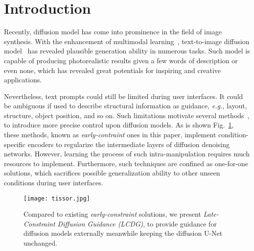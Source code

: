 \documentclass{article}
\begin{document}
\section{Introduction}







Recently, diffusion model has come into prominence in the field of image synthesis. With the enhancement of multimodal learning~\cite{radford2021learning, cherti2022reproducible, raffel2020exploring}, text-to-image diffusion model~\cite{rombach2022high, huang2023composer, saharia2022photorealistic, nichol2021glide, gu2022vector, avrahami2022blended, kim2022diffusionclip, brooks2022instructpix2pix, gafni2022make, kawar2022imagic, liu2023more} has revealed plausible generation ability in numerous tasks. Such model is capable of producing photorealistic results given a few words of description or even none, which has revealed great potentials for inspiring and creative applications.

Nevertheless, text prompts could still be limited during user interfaces. It could be ambiguous if used to describe structural information as guidance, \textit{e.g.}, layout, structure, object position, and so on. Such limitations motivate several methods~\cite{zhang2023adding,mou2023t2i}, to introduce more precise control upon diffusion models. As is shown Fig.~\ref{figure:tissor}, these methods, known as \textit{early-contraint} ones in this paper, implement condition-specific encoders to regularize the intermediate layers of diffusion denoising networks. However, learning the process of such intra-manipulation requires much resources to implement. Furthermore, such techniques are confined as one-for-one solutions, which sacrifices possible generalization ability to other unseen conditions during user interfaces.



\begin{figure}[t!]
  \centering
  \texttt{[image: tissor.jpg]} \vspace{-1.5em}
  \caption{Compared to existing \textit{early-constraint} solutions, we present \textit{Late-Constraint Diffusion Guidance (LCDG)}, to provide guidance for diffusion models externally meanwhile keeping the diffusion U-Net unchanged.}
  \label{figure:tissor}
  \vspace{-1.5em}
  \end{figure}
\end{document}
